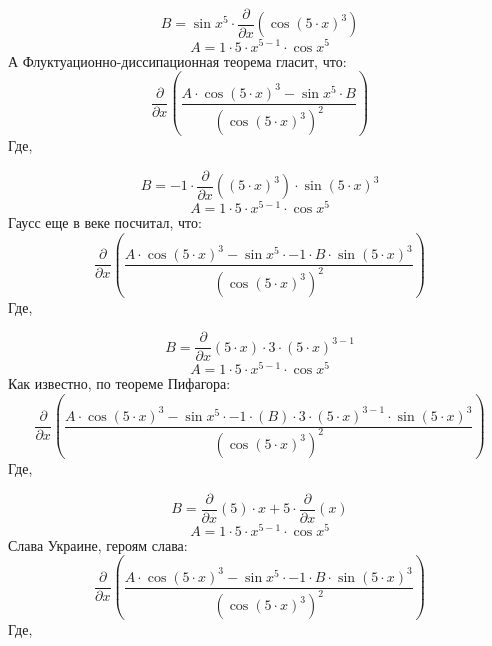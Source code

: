 \documentclass[12pt]{article}
\begin{document}
\begin{equation}
	B = 
\sin {x^{5}}\cdot \frac{\partial}{\partial x}\left( \cos {\left( 5\cdot x\right) ^{3}}\right) 
\end{equation}
\begin{equation}
	A = 
1\cdot 5\cdot x^{5 - 1}\cdot \cos {x^{5}}
\end{equation}
А Флуктуационно-диссипационная теорема гласит, что:  \begin{equation}
	\frac{\partial}{\partial x}\left( \frac{A\cdot \cos {\left( 5\cdot x\right) ^{3}} - \sin {x^{5}}\cdot B}{\left( \cos {\left( 5\cdot x\right) ^{3}}\right) ^{2}}\right) 
\end{equation}
Где, 

\begin{equation}
	B = 
-1\cdot \frac{\partial}{\partial x}\left( \left( 5\cdot x\right) ^{3}\right) \cdot \sin {\left( 5\cdot x\right) ^{3}}
\end{equation}
\begin{equation}
	A = 
1\cdot 5\cdot x^{5 - 1}\cdot \cos {x^{5}}
\end{equation}
Гаусс еще в  веке посчитал, что:  \begin{equation}
	\frac{\partial}{\partial x}\left( \frac{A\cdot \cos {\left( 5\cdot x\right) ^{3}} - \sin {x^{5}}\cdot -1\cdot B\cdot \sin {\left( 5\cdot x\right) ^{3}}}{\left( \cos {\left( 5\cdot x\right) ^{3}}\right) ^{2}}\right) 
\end{equation}
Где, 

\begin{equation}
	B = 
\frac{\partial}{\partial x}\left( 5\cdot x\right) \cdot 3\cdot \left( 5\cdot x\right) ^{3 - 1}
\end{equation}
\begin{equation}
	A = 
1\cdot 5\cdot x^{5 - 1}\cdot \cos {x^{5}}
\end{equation}
Как известно, по теореме Пифагора:  \begin{equation}
	\frac{\partial}{\partial x}\left( \frac{A\cdot \cos {\left( 5\cdot x\right) ^{3}} - \sin {x^{5}}\cdot -1\cdot \left( B\right) \cdot 3\cdot \left( 5\cdot x\right) ^{3 - 1}\cdot \sin {\left( 5\cdot x\right) ^{3}}}{\left( \cos {\left( 5\cdot x\right) ^{3}}\right) ^{2}}\right) 
\end{equation}
Где, 

\begin{equation}
	B = 
\frac{\partial}{\partial x}\left( 5\right) \cdot x + 5\cdot \frac{\partial}{\partial x}\left( x\right) 
\end{equation}
\begin{equation}
	A = 
1\cdot 5\cdot x^{5 - 1}\cdot \cos {x^{5}}
\end{equation}
Слава Украине, героям слава:  \begin{equation}
	\frac{\partial}{\partial x}\left( \frac{A\cdot \cos {\left( 5\cdot x\right) ^{3}} - \sin {x^{5}}\cdot -1\cdot B\cdot \sin {\left( 5\cdot x\right) ^{3}}}{\left( \cos {\left( 5\cdot x\right) ^{3}}\right) ^{2}}\right) 
\end{equation}
Где, 
\end{document}
